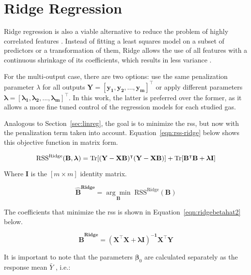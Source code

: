 \section{Ridge Regression}
\label{sec:ridge}

Ridge regression is also a viable alternative to reduce the problem of highly correlated features \parencite{friedman2001}. Instead of fitting a least squares model on a subset of predictors or a transformation of them, Ridge allows the use of all features with a continuous shrinkage of its coefficients, which results in less variance \parencite{friedman2001}.

For the multi-output case, there are two options: use the same penalization parameter $\lambda$ for all outputs $\mathbf{Y = [y_1, y_2, ... , y_m]^\intercal}$ or apply different parameters $\mathbf{\boldsymbol{\lambda} = [\lambda_1, \lambda_2, ... , \lambda_m]^\intercal}$. In this work, the latter is preferred over the former, as it allows a more fine tuned control of the regression models for each studied gas.

Analogous to Section~\ref{sec:linreg}, the goal is to minimize the \acrshort{rss}, but now with the penalization term taken into account. Equation~\ref{eqn:rss-ridge} below shows this objective function in matrix form.

\begin{equation} 
	\label{eqn:rss-ridge}
	\text{RSS}^{\text{Ridge}}(\mathbf{B, \boldsymbol{\lambda} }) = \operatorname{Tr} [\mathbf{(Y-XB)^\intercal (Y-XB)}] + \operatorname{Tr}[\mathbf{B^\intercal B + \boldsymbol{\lambda} I}]
\end{equation}

Where $\mathbf{I}$ is the $[m \times m]$ identity matrix.

\begin{equation}
	\label{eqn:ridgebetahat}
	\mathbf{\hat{B}^\text{Ridge}} = \underset{\mathbf{B}}{\arg\min} 	\; \text{RSS}^{\text{Ridge}}(\mathbf{B})
\end{equation}	

The coefficients that minimize the \acrshort{rss} is shown in Equation~\ref{eqn:ridgebetahat2} below.

\begin{equation}
	\label{eqn:ridgebetahat2}
	\mathbf{\hat{B}^\text{Ridge}} = \mathbf{(X^\intercal X + \boldsymbol{\lambda}  I )^{-1} X^\intercal Y}
\end{equation}

It is important to note that the parameters $\boldsymbol{\beta}_0$ are calculated separately as the response mean $\bar{Y}$ \parencite{friedman2001}, i.e.:

